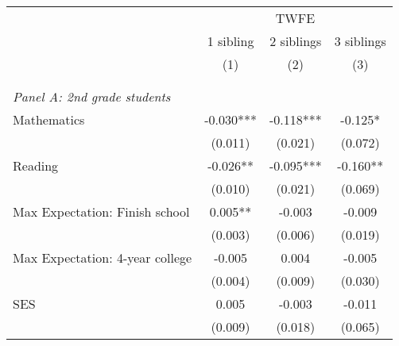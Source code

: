 \makeatletter
{}
{
\makeatother
\begin{tabular}{lccc}
\toprule
\cmidrule(lr){2-4}
& \multicolumn{3}{c}{TWFE}  \\
\cmidrule(lr){2-4}
& 1 sibling & 2 siblings & 3 siblings  \\
\cmidrule(lr){2-2} \cmidrule(lr){3-3} \cmidrule(lr){4-4}
& (1) & (2) & (3)\\
\bottomrule
&  &  &  \\
&  &  &   \\
\multicolumn{4}{l}{\textit{Panel A: 2nd grade students}} \\
\hspace{3mm}Mathematics&      -0.030***&      -0.118***&      -0.125*  \\
                    &     (0.011)   &     (0.021)   &     (0.072)   \\
 
\hspace{3mm}Reading &      -0.026** &      -0.095***&      -0.160** \\
                    &     (0.010)   &     (0.021)   &     (0.069)   \\
 
\hspace{3mm}Max Expectation: Finish school&       0.005** &      -0.003   &      -0.009   \\
                    &     (0.003)   &     (0.006)   &     (0.019)   \\
 
\hspace{3mm}Max Expectation: 4-year college&      -0.005   &       0.004   &      -0.005   \\
                    &     (0.004)   &     (0.009)   &     (0.030)   \\
 
\hspace{3mm}SES     &       0.005   &      -0.003   &      -0.011   \\
                    &     (0.009)   &     (0.018)   &     (0.065)   \\
 

\end{tabular}}
